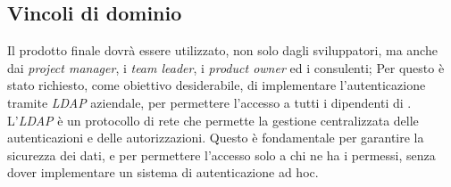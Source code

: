 \subsection*{ Vincoli di dominio}
Il prodotto finale dovrà essere utilizzato, non solo dagli sviluppatori, ma anche dai \textit{project manager}, i \textit{team leader},
 i \textit{product owner} ed i consulenti; 
 Per questo è stato richiesto, come obiettivo desiderabile, di implementare l'autenticazione tramite \textit{LDAP} aziendale, 
per permettere l'accesso a tutti i dipendenti di {\azienda}.\\
L'\textit{LDAP} è un protocollo di rete che permette la gestione centralizzata delle autenticazioni e delle autorizzazioni.
Questo è fondamentale per garantire la sicurezza dei dati, e per permettere l'accesso solo a chi ne ha i permessi, senza dover
implementare un sistema di autenticazione ad hoc.\\
